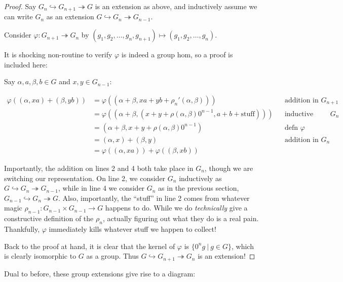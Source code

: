 \documentclass[12pt]{article}
\theoremstyle{definition}
\newcommand{\mono}{\hookrightarrow}
\newcommand{\epi}{\twoheadrightarrow}
\begin{document}
  \begin{proof}
    Say $G_n \mono G_{n+1} \epi G$ is an extension as above, and 
    inductively assume we can write $G_n$ as an extension
    $G \mono G_n \epi G_{n-1}$.

    Consider $\varphi : G_{n+1} \epi G_n$ by 
    $(g_1, g_2, \ldots, g_n, g_{n+1}) \mapsto (g_1, g_2, \ldots, g_n)$.

    It is shocking non-routine to verify $\varphi$ is indeed a group hom, 
    so a proof is included here:

    Say $\alpha, a, \beta, b \in G$ and $x,y \in G_{n-1}$:

    \begin{align*}
      \varphi((\alpha, xa) + (\beta, yb)) 
      &= \varphi((\alpha + \beta, xa + yb + \rho_n'(\alpha,\beta))) 
        && \text{addition in $G_{n+1}$}\\
      &= \varphi((\alpha + \beta, (x + y + \rho(\alpha,\beta)0^{n-1}, a + b + \text{stuff})))
        && \text{inductive addition in $G_n$}\\
      &= (\alpha + \beta, x+y+\rho(\alpha,\beta)0^{n-1})
        && \text{defn $\varphi$}\\
      &= (\alpha, x) + (\beta, y)
        && \text{addition in $G_n$}\\
      &= \varphi((\alpha,xa)) + \varphi((\beta,xb))
    \end{align*}

    Importantly, the addition on lines 2 and 4 both take place in $G_n$, 
    though we are switching our representation. On line 2, we consider
    $G_n$ inductively as $G \mono G_n \epi G_{n-1}$, while in line 4 we
    consider $G_n$ as in the previous section, $G_{n-1} \mono G_n \epi G$.
    Also, importantly, the ``stuff'' in line 2 comes from whatever
    magic $\rho_{n-1} : G_{n-1} \times G_{n-1} \to G$ happens to do. While
    we do \emph{technically} give a constructive definition of the $\rho_n$,
    actually figuring out what they do is a real pain. Thankfully, $\varphi$
    immediately kills whatever stuff we happen to collect!

    Back to the proof at hand, it is clear that the kernel of $\varphi$ is
    $\{0^ng~|~g \in G \}$, which is clearly isomorphic to $G$ as a group. 
    Thus $G \mono G_{n+1} \epi G_n$ is an extension! 
  \end{proof}

  Dual to before, these group extensions give rise to a diagram:

  \begin{center}
  \end{center}
\end{document}

